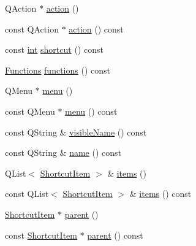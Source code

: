 \begin{DoxyCompactItemize}
Q\+Action $\ast$ \mbox{\hyperlink{class_q_g_b_a_1_1_shortcut_controller_1_1_shortcut_item_abd1d36951420bdfcfa6b2c249267de86}{action}} ()
\item 
const Q\+Action $\ast$ \mbox{\hyperlink{class_q_g_b_a_1_1_shortcut_controller_1_1_shortcut_item_a1f3c74fe0b8639884645e9227fd4d492}{action}} () const
\item 
const \mbox{\hyperlink{ioapi_8h_a787fa3cf048117ba7123753c1e74fcd6}{int}} \mbox{\hyperlink{class_q_g_b_a_1_1_shortcut_controller_1_1_shortcut_item_a9dad28d0bb9557439965aad43e19918b}{shortcut}} () const
\item 
\mbox{\hyperlink{class_q_g_b_a_1_1_shortcut_controller_1_1_shortcut_item_a28ffcf4fe5bf253d0d47e2357794ddf1}{Functions}} \mbox{\hyperlink{class_q_g_b_a_1_1_shortcut_controller_1_1_shortcut_item_aa542632ee6a4bcfc84eac410da7a00a9}{functions}} () const
\item 
Q\+Menu $\ast$ \mbox{\hyperlink{class_q_g_b_a_1_1_shortcut_controller_1_1_shortcut_item_a296df2db2b49071da0109ea44b0ae8af}{menu}} ()
\item 
const Q\+Menu $\ast$ \mbox{\hyperlink{class_q_g_b_a_1_1_shortcut_controller_1_1_shortcut_item_a953c2c20299838da7ddc74af40b5d1fd}{menu}} () const
\item 
const Q\+String \& \mbox{\hyperlink{class_q_g_b_a_1_1_shortcut_controller_1_1_shortcut_item_ae2d16e4707f16335037bf37d2e4778e7}{visible\+Name}} () const
\item 
const Q\+String \& \mbox{\hyperlink{class_q_g_b_a_1_1_shortcut_controller_1_1_shortcut_item_a5efd926d69c160940c2698c31a7de8c3}{name}} () const
\item 
Q\+List$<$ \mbox{\hyperlink{class_q_g_b_a_1_1_shortcut_controller_1_1_shortcut_item}{Shortcut\+Item}} $>$ \& \mbox{\hyperlink{class_q_g_b_a_1_1_shortcut_controller_1_1_shortcut_item_a9f7386270628d798905603ebc5c54bc0}{items}} ()
\item 
const Q\+List$<$ \mbox{\hyperlink{class_q_g_b_a_1_1_shortcut_controller_1_1_shortcut_item}{Shortcut\+Item}} $>$ \& \mbox{\hyperlink{class_q_g_b_a_1_1_shortcut_controller_1_1_shortcut_item_ae95ea732d9fc8149e392ab0f966b07fc}{items}} () const
\item 
\mbox{\hyperlink{class_q_g_b_a_1_1_shortcut_controller_1_1_shortcut_item}{Shortcut\+Item}} $\ast$ \mbox{\hyperlink{class_q_g_b_a_1_1_shortcut_controller_1_1_shortcut_item_a3afcfd0baea4e94f4d0a8b5afe802a51}{parent}} ()
\item 
const \mbox{\hyperlink{class_q_g_b_a_1_1_shortcut_controller_1_1_shortcut_item}{Shortcut\+Item}} $\ast$ \mbox{\hyperlink{class_q_g_b_a_1_1_shortcut_controller_1_1_shortcut_item_a57e302e6b6d195fb4234f97b08e843f0}{parent}} () const

\end{DoxyCompactItemize}
